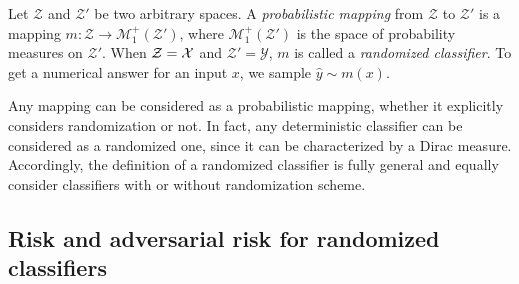 \begin{definition}
\label{def::ProbMapping}
Let $\mathcal{Z}$ and $\mathcal{Z}'$ be two arbitrary spaces. A \emph{probabilistic mapping} from $\mathcal{Z}$ to $\mathcal{Z}'$ is a mapping $m : \mathcal{Z} \rightarrow \mathcal{M}^+_1\left(\mathcal{Z}' \right)$, where $ \mathcal{M}^+_1\left(\mathcal{Z}' \right)$ is the space of probability measures on $\mathcal{Z}'$. 
When $\mathcal{Z} = \mathcal{X}$ and $\mathcal{Z}' =\mathcal{Y}$, $m $ is called a \emph{randomized classifier}. To get a numerical answer for an input $x $, we sample $\hat{y} \sim m ( x  )$.
\end{definition}

Any mapping can be considered as a probabilistic mapping, whether it explicitly considers randomization or not. In fact, any deterministic classifier can be considered as a randomized one, since it can be characterized by a Dirac measure. Accordingly, the definition of a randomized classifier is fully general and equally consider classifiers with or without randomization scheme.

\subsection{Risk and adversarial risk for randomized classifiers}


